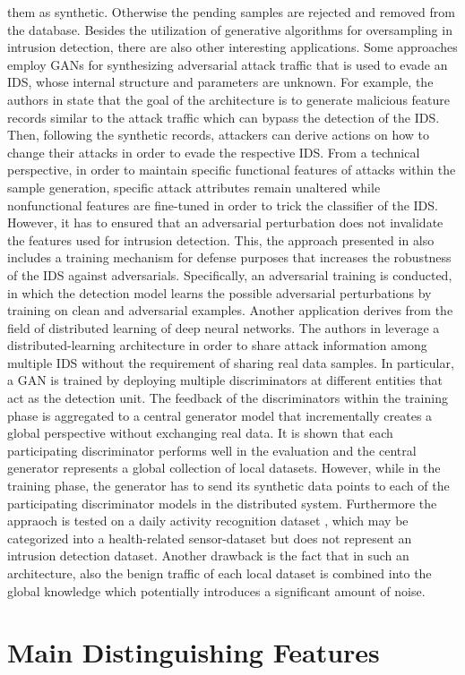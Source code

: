 \documentclass[../../main.tex]{subfiles}
\begin{document}
them as synthetic. Otherwise the pending samples are rejected and removed from the database. Besides the utilization of generative algorithms for oversampling in intrusion detection, there are also other interesting applications. Some approaches employ GANs for synthesizing adversarial attack traffic that is used to evade an IDS, whose internal structure and parameters are unknown. For example, the authors in \cite{lin2022idsgan} state that the goal of the architecture is to generate malicious feature records similar to the attack traffic which can bypass the detection of the IDS. Then, following the synthetic records, attackers can derive actions on how to change their attacks in order to evade the respective IDS. From a technical perspective, in order to maintain specific functional features of attacks within the sample generation, specific attack attributes remain unaltered while nonfunctional features are fine-tuned in order to trick the classifier of the IDS. However, it has to ensured that an adversarial perturbation does not invalidate the features used for intrusion detection. This, the approach presented in \cite{usama2019generative} also includes a training mechanism for defense purposes that increases the robustness of the IDS against adversarials. Specifically, an adversarial training \cite{szegedy2013intriguing} is conducted, in which the detection model learns the possible adversarial perturbations by training on clean and adversarial examples. Another application derives from the field of distributed learning of deep neural networks. The authors in \cite{ferdowsi2019generative} leverage a distributed-learning architecture in order to share attack information among multiple IDS without the requirement of sharing real data samples. In particular, a GAN is trained by deploying multiple discriminators at different entities that act as the detection unit. The feedback of the discriminators within the training phase is aggregated to a central generator model that incrementally creates a global perspective without exchanging real data. It is shown that each participating discriminator performs well in the evaluation and the central generator represents a global collection of local datasets. However, while in the training phase, the generator has to send its synthetic data points to each of the participating discriminator models in the distributed system. Furthermore the appraoch is tested on a daily activity recognition dataset \cite{reyes2016transition}, which may be categorized into a health-related sensor-dataset but does not represent an intrusion detection dataset. Another drawback is the fact that in such an architecture, also the benign traffic of each local dataset is combined into the global knowledge which potentially introduces a significant amount of noise. 

\section{Main Distinguishing Features}
\end{document}
